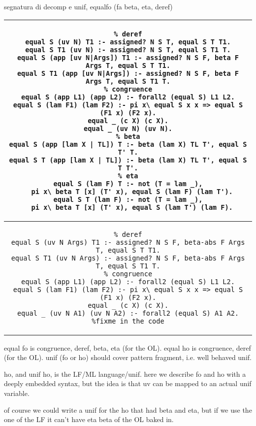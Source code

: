 \documentclass{rapport}
\begin{document}
segnatura di decomp e unif, equalfo (fa beta, eta, deref)

\begin{tabular}{c}
\begin{minipage}{.9\textwidth}
\begin{verbatim}
% deref
equal S (uv N) T1 :- assigned? N S T, equal S T T1.
equal S T1 (uv N) :- assigned? N S T, equal S T1 T.
equal S (app [uv N|Args]) T1 :- assigned? N S F, beta F Args T, equal S T T1.
equal S T1 (app [uv N|Args]) :- assigned? N S F, beta F Args T, equal S T1 T.
% congruence
equal S (app L1) (app L2) :- forall2 (equal S) L1 L2.
equal S (lam F1) (lam F2) :- pi x\ equal S x x => equal S (F1 x) (F2 x).
equal _ (c X) (c X).
equal _ (uv N) (uv N).
% beta
equal S (app [lam X | TL]) T :- beta (lam X) TL T', equal S T' T.
equal S T (app [lam X | TL]) :- beta (lam X) TL T', equal S T T'.
% eta
equal S (lam F) T :- not (T = lam _),
  pi x\ beta T [x] (T' x), equal S (lam F) (lam T').
equal S T (lam F) :- not (T = lam _),
  pi x\ beta T [x] (T' x), equal S (lam T') (lam F).
\end{verbatim}
\end{minipage}
\\\hline
\begin{minipage}{.9\textwidth}
\begin{verbatim}
% deref
equal S (uv N Args) T1 :- assigned? N S F, beta-abs F Args T, equal S T T1.
equal S T1 (uv N Args) :- assigned? N S F, beta-abs F Args T, equal S T1 T.
% congruence
equal S (app L1) (app L2) :- forall2 (equal S) L1 L2.
equal S (lam F1) (lam F2) :- pi x\ equal S x x => equal S (F1 x) (F2 x).
equal _ (c X) (c X).
equal _ (uv N A1) (uv N A2) :- forall2 (equal S) A1 A2. %fixme in the code
\end{verbatim}
\end{minipage}

\end{tabular}

equal fo is congruence, deref, beta, eta (for the OL).
equal ho is congruence, deref (for the OL).
unif (fo or ho) should cover pattern fragment, i.e. well behaved unif.

ho, and unif ho, is the LF/ML language/unif. here we describe fo and ho
with a deeply embedded syntax, but the idea is that uv can be mapped to
an actual unif variable.

of course we could write a unif for the ho that had beta and eta,
but if we use the one of the LF it can't have eta beta of the OL baked in.
\end{document}
